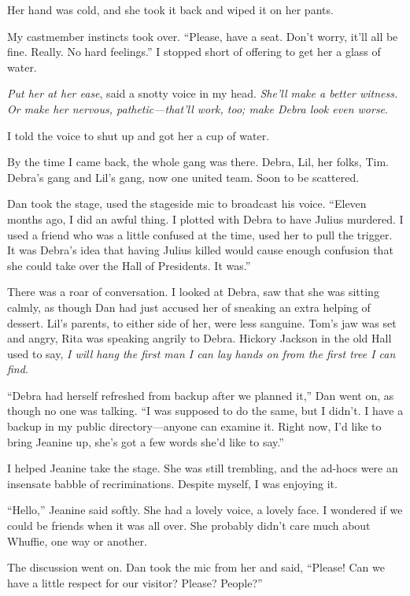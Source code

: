 Her hand was cold, and she took it back and wiped it on her pants.

My castmember instincts took over. “Please, have a seat. Don't
worry, it'll all be fine. Really. No hard feelings.” I stopped
short of offering to get her a glass of water.

\emph{Put her at her ease}, said a snotty voice in my head.
\emph{She'll make a better witness. Or make her nervous, pathetic—that'll work, too; make Debra look even worse}.

I told the voice to shut up and got her a cup of water.

By the time I came back, the whole gang was there. Debra, Lil, her
folks, Tim. Debra's gang and Lil's gang, now one united team. Soon
to be scattered.

Dan took the stage, used the stageside mic to broadcast his voice.
“Eleven months ago, I did an awful thing. I plotted with Debra to
have Julius murdered. I used a friend who was a little confused at
the time, used her to pull the trigger. It was Debra's idea that
having Julius killed would cause enough confusion that she could
take over the Hall of Presidents. It was.”

There was a roar of conversation. I looked at Debra, saw that she
was sitting calmly, as though Dan had just accused her of sneaking
an extra helping of dessert. Lil's parents, to either side of her,
were less sanguine. Tom's jaw was set and angry, Rita was speaking
angrily to Debra. Hickory Jackson in the old Hall used to say,
\emph{I will hang the first man I can lay hands on from the first tree I can find}.

“Debra had herself refreshed from backup after we planned it,” Dan
went on, as though no one was talking. “I was supposed to do the
same, but I didn't. I have a backup in my public directory—anyone
can examine it. Right now, I'd like to bring Jeanine up, she's got
a few words she'd like to say.”

I helped Jeanine take the stage. She was still trembling, and the
ad-hocs were an insensate babble of recriminations. Despite myself,
I was enjoying it.

“Hello,” Jeanine said softly. She had a lovely voice, a lovely
face. I wondered if we could be friends when it was all over. She
probably didn't care much about Whuffie, one way or another.

The discussion went on. Dan took the mic from her and said,
“Please! Can we have a little respect for our visitor? Please?
People?”

